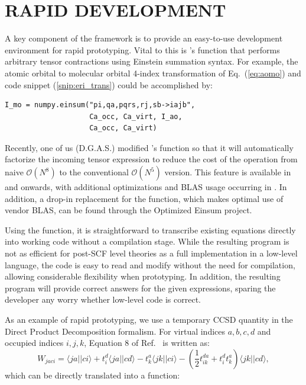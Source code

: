\documentclass[%
  class = book,%
  crop = false,%
  float = true,%
  multi = true,%
  preview = false,%
]{standalone}
\let\cite\autocite
\newcommand{\caps}[1]{\uppercase{#1}}
\begin{document}
\section{\texorpdfstring{\caps{Rapid Development}}{Rapid Development}}

A key component of the \pfn framework is to provide an easy-to-use development environment for rapid prototyping. Vital to this is \numpy's \einsum function that performs arbitrary tensor contractions using Einstein summation syntax.  For example, the atomic orbital to molecular orbital 4-index transformation of Eq.~(\ref{eq:aomo}) and code snippet (\ref{snip:eri_trans}) could be accomplished by:

\begin{verbatim}
I_mo = numpy.einsum("pi,qa,pqrs,rj,sb->iajb",
                    Ca_occ, Ca_virt, I_ao,
                    Ca_occ, Ca_virt)
\end{verbatim}
Recently, one of us (D.G.A.S.) modified \numpy's \einsum function so that it will automatically factorize the incoming tensor expression to reduce the cost of the operation from naive \(\mathcal{O}(N^8)\) to the conventional \(\mathcal{O}(N^5)\) version. This feature is available in  and onwards, with additional optimizations and BLAS usage occurring in . In addition, a drop-in replacement for the \einsum function, which makes optimal use of vendor BLAS, can be found through the Optimized Einsum project.\cite{danielsmith2016:160842}

Using the \einsum function, it is straightforward to transcribe existing equations directly into working code without a compilation stage.  While the resulting program is not as efficient for post-SCF level theories as a full implementation in a low-level language, the code is easy to read and modify without the need for compilation, allowing considerable flexibility when prototyping. In addition, the resulting program will provide correct answers for the given expressions, sparing the developer any worry whether low-level code is correct.

As an example of rapid prototyping, we use a temporary CCSD quantity in the Direct Product Decomposition formalism\cite{Bartlett1991:4334}. For virtual indices \(a, b, c, d\) and occupied indices \(i,j,k\), Equation 8 of Ref.~\parencite{Bartlett1991:4334} is written as:
\begin{equation}
  W_{jaci} = \langle ja || ci \rangle + t^d_i \langle ja || cd \rangle - t^a_k \langle jk || ci \rangle - (\frac{1}{2}t^{da}_{ik} + t^d_it^a_k) \langle jk || cd \rangle,
\end{equation}
which can be directly translated into a function:
\end{document}
